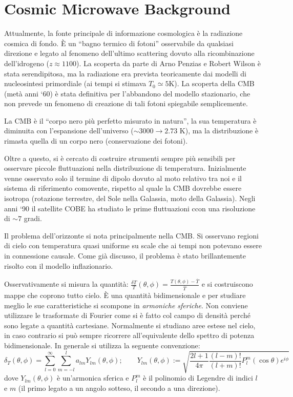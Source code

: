 \chapter{Cosmic Microwave Background}\label{11:ch}
Attualmente, la fonte principale di informazione cosmologica è la radiazione cosmica di fondo. È un ``bagno termico di fotoni'' osservabile da qualsiasi direzione e legato al fenomeno dell'ultimo scattering dovuto alla ricombinazione dell'idrogeno ($z\approx 1100$). La scoperta da parte di Arno Penzias e Robert Wilson è stata serendipitosa, ma la radiazione era prevista teoricamente dai modelli di nucleosintesi primordiale (ai tempi si stimava $T_0\simeq 5$K). La scoperta della CMB (metà anni `60) è stata definitiva per l'abbandono del modello stazionario, che non prevede un fenomeno di creazione di tali fotoni spiegabile semplicemente. 

La CMB è il ``corpo nero più perfetto misurato in natura'', la sua temperatura è diminuita con l'espansione dell'universo ($\sim 3000 \to 2.73$ K), ma la distribuzione è rimasta quella di un corpo nero (conservazione dei fotoni). 

Oltre a questo, si è cercato di costruire strumenti sempre più sensibili per osservare piccole fluttuazioni nella distribuzione di temperatura. Inizialmente venne osservato solo il termine di dipolo dovuto al moto relativo tra noi e il sistema di riferimento comovente, rispetto al quale la CMB dovrebbe essere isotropa (rotazione terrestre, del Sole nella Galassia, moto della Galassia). Negli anni `90 il satellite COBE ha studiato le prime fluttuazioni ccon una risoluzione di $\sim 7$ gradi. 

Il problema dell'orizzonte si nota principalmente nella CMB. Si osservano regioni di cielo con temperatura quasi uniforme su scale che ai tempi non potevano essere in connessione causale. Come già discusso, il problema è stato brillantemente risolto con il modello inflazionario. 

\vspace{1em}
Osservativamente si misura la quantità: $\frac{\delta T }{T} (\theta, \phi)=\frac{T(\theta,\phi) - \overline{T}}{\overline{T}}$ e si costruiscono mappe che coprono tutto cielo. È una quantità bidimensionale e per studiare meglio le sue caratteristiche si scompone in \textit{armoniche sferiche}. Non conviene utilizzare le trasformate di Fourier come si è fatto col campo di densità perché sono legate a quantità cartesiane. Normalmente si studiano aree estese nel cielo, in caso contrario si può sempre ricorrere all'equivalente dello spettro di potenza bidimensionale. In generale si utilizza la seguente convenzione:
\begin{equation}
    \delta_T (\theta, \phi) = \sum_{l=0}^\infty \sum_{m=-l}^{l}a_{lm}Y_{lm} (\theta, \phi); \qquad Y_{lm} (\theta, \phi):= \sqrt{\frac{2l+1}{4\pi}\frac{(l-m)!}{(l+m)!}P_l^m (\cos\theta)e^{i\phi}}
\end{equation}
dove $Y_{lm}(\theta, \phi)$ è un'armonica sferica e $P_l^m$ è il polinomio di Legendre di indici $l$ e $m$ (il primo legato a un angolo sotteso, il secondo a una direzione). 

